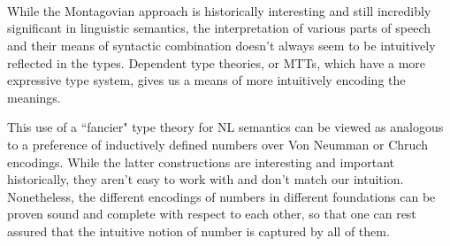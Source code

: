 \begin{code}%
\>[0]\AgdaSpace{}%
\AgdaSymbol{:}\AgdaSpace{}%
\AgdaSpace{}%
\AgdaSpace{}%
\<%
\\
\>[0]\AgdaSpace{}%
\AgdaSymbol{(}\AgdaSpace{}%
\AgdaOperator{\AgdaInductiveConstructor{,}}\AgdaSpace{}%
\AgdaSpace{}%
\AgdaOperator{\AgdaInductiveConstructor{,}}\AgdaSpace{}%
\AgdaSpace{}%
\AgdaSymbol{)}\AgdaSpace{}%
\AgdaSymbol{=}\AgdaSpace{}%
\AgdaSpace{}%
\AgdaOperator{\AgdaInductiveConstructor{,}}\AgdaSpace{}%
\AgdaSpace{}%
\AgdaOperator{\AgdaInductiveConstructor{,}}\AgdaSpace{}%
\AgdaSpace{}%
\AgdaOperator{\AgdaInductiveConstructor{,}}\AgdaSpace{}%
\AgdaSpace{}%
\AgdaOperator{\AgdaInductiveConstructor{,}}\AgdaSpace{}%
\<%
\\
\>[0]\AgdaSpace{}%
\AgdaSymbol{:}\AgdaSpace{}%
\AgdaSpace{}%
\AgdaSpace{}%
\<%
\\
\>[0]\AgdaSpace{}%
\AgdaSymbol{(}\AgdaSpace{}%
\AgdaOperator{\AgdaInductiveConstructor{,}}\AgdaSpace{}%
\AgdaSpace{}%
\AgdaOperator{\AgdaInductiveConstructor{,}}\AgdaSpace{}%
\AgdaSpace{}%
\AgdaSymbol{)}\AgdaSpace{}%
\AgdaSymbol{=}\AgdaSpace{}%
\AgdaSpace{}%
\AgdaOperator{\AgdaInductiveConstructor{,}}\AgdaSpace{}%
\AgdaSpace{}%
\AgdaOperator{\AgdaInductiveConstructor{,}}\AgdaSpace{}%
\AgdaSpace{}%
\AgdaOperator{\AgdaInductiveConstructor{,}}\AgdaSpace{}%
\AgdaSpace{}%
\AgdaOperator{\AgdaInductiveConstructor{,}}\AgdaSpace{}%
\<%
\end{code}

While the Montagovian approach is historically interesting and still incredibly
significant in linguistic semantics, the interpretation of various parts of
speech and their means of syntactic combination doesn't always seem to be intuitively reflected in the types. Dependent type theories, or MTTs, which have a more expressive type system, gives us a means of more intuitively encoding the meanings.

This use of a ``fancier" type theory for NL semantics can be viewed as analogous
to a preference of inductively defined numbers over Von Neumman or Chruch
encodings. While the latter constructions are interesting and important
historically, they aren't easy to work with and don't match our intuition.
Nonetheless, the different encodings of numbers in different foundations can be
proven sound and complete with respect to each other, so that one can rest
assured that the intuitive notion of number is captured by all of them.

